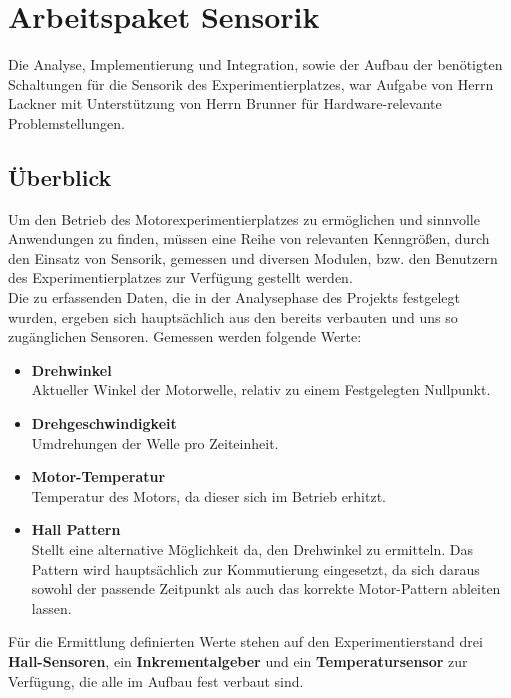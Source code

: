 

\chapter{Arbeitspaket Sensorik}
Die Analyse, Implementierung und Integration, sowie der Aufbau der ben\"otigten Schaltungen f\"ur die Sensorik des Experimentierplatzes, war Aufgabe von Herrn Lackner mit Unterst\"utzung von Herrn Brunner f\"ur Hardware-relevante Problemstellungen.

\section{\"Uberblick}
Um den Betrieb des Motorexperimentierplatzes zu erm\"oglichen und sinnvolle Anwendungen zu finden, m\"ussen eine Reihe von relevanten Kenngr\"o{\ss}en, durch den Einsatz von Sensorik, gemessen und diversen Modulen, bzw. den Benutzern des Experimentierplatzes zur Verf\"ugung gestellt werden. \\
Die zu erfassenden Daten, die in der Analysephase des Projekts festgelegt wurden, ergeben sich haupts\"achlich aus den bereits verbauten und uns so zug\"anglichen Sensoren. Gemessen werden folgende Werte:
\begin{itemize}
\item \textbf{Drehwinkel} \\
Aktueller Winkel der Motorwelle, relativ zu einem Festgelegten Nullpunkt.
\item \textbf{Drehgeschwindigkeit} \\
Umdrehungen der Welle pro Zeiteinheit.
\item \textbf{Motor-Temperatur} \\
Temperatur des Motors, da dieser sich im Betrieb erhitzt.
\item \textbf{Hall Pattern} \\
Stellt eine alternative M\"oglichkeit da, den Drehwinkel zu ermitteln. Das Pattern wird haupts\"achlich zur Kommutierung eingesetzt, da sich daraus sowohl der passende Zeitpunkt als auch das korrekte Motor-Pattern ableiten lassen.
\end{itemize}
Für die Ermittlung definierten Werte stehen auf den Experimentierstand drei \textbf{Hall-Sensoren}, ein \textbf{Inkrementalgeber} und ein \textbf{Temperatursensor} zur Verfügung, die alle im Aufbau fest verbaut sind. 

